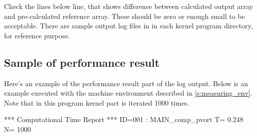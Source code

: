 Check the lines below  line,
that shows difference between calculated output array and
pre-calculated reference array.
These should be zero or enough small to be acceptable.
%
There are sample output log files in 
in each kernel program directory, for reference purpose.


\subsection{Sample of performance result}

Here's an example of the performance result part of the log output.
Below is an example executed with the machine environment described in \autoref{s:measuring_env}.
%
Note that in this program kernel part is iterated 1000 times.

\begin{LstLog}
 *** Computational Time Report
 *** ID=001 : MAIN_comp_pvort                  T=     0.248 N=   1000
\end{LstLog}

